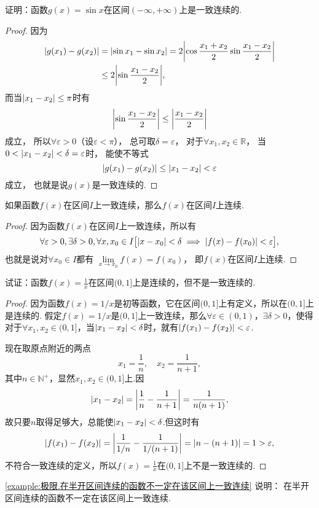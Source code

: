 \begin{example}
证明：函数\(g(x)=\sin x\)在区间\((-\infty,+\infty)\)上是一致连续的.
\begin{proof}
因为
\begin{align*}
\abs{g(x_1)-g(x_2)}
&= \abs{\sin x_1 - \sin x_2}
= 2\abs{\cos\frac{x_1+x_2}{2} \sin\frac{x_1-x_2}{2}} \\
&\leq 2\abs{\sin\frac{x_1-x_2}{2}},
\end{align*}
而当\(\abs{x_1-x_2} \leq \pi\)时有\[
\abs{\sin\frac{x_1-x_2}{2}} \leq \abs{\frac{x_1-x_2}{2}}
\]成立，
所以\(\forall\varepsilon>0\)（设\(\varepsilon<\pi\)），
总可取\(\delta=\varepsilon\)，
对于\(\forall x_1,x_2\in\mathbb{R}\)，
当\(0<\abs{x_1-x_2}<\delta=\varepsilon\)时，
能使不等式\[
\abs{g(x_1)-g(x_2)} \leq \abs{x_1-x_2} < \varepsilon
\]成立，
也就是说\(g(x)\)是一致连续的.
\end{proof}
\end{example}

\begin{theorem}\label{theorem:极限.闭区间上连续函数的性质.一致连续函数一定连续}
如果函数\(f(x)\)在区间\(I\)上一致连续，那么\(f(x)\)在区间\(I\)上连续.
\begin{proof}
因为函数\(f(x)\)在区间\(I\)上一致连续，所以有
\[
\forall \varepsilon > 0,
\exists \delta > 0,
\forall x,x_0 \in I
\bigl[
	 \abs{x-x_0} < \delta
	 \implies
	 \abs{f(x)-f(x_0)} < \varepsilon
\bigr],
\]
也就是说对\(\forall x_0 \in I\)都有%
\(\lim\limits_{x \to x_0} f(x) = f(x_0)\)，
即\(f(x)\)在区间\(I\)上连续.
\end{proof}
\end{theorem}

\begin{example}\label{example:极限.在半开区间连续的函数不一定在该区间上一致连续}
试证：函数\(f(x) = \frac{1}{x}\)在区间\((0,1]\)上是连续的，但不是一致连续的.
\begin{proof}
因为函数\(f(x) = 1/x\)是初等函数，它在区间\((0,1]\)上有定义，所以在\((0,1]\)上是连续的.
假定\(f(x) = 1/x\)是\((0,1]\)上一致连续，那么\(\forall \varepsilon \in (0,1)\)，\(\exists \delta > 0\)，使得对于\(\forall x_1,x_2 \in (0,1]\)，当\(\abs{x_1 - x_2} < \delta\)时，就有\(\abs{f(x_1) - f(x_2)} < \varepsilon\).

现在取原点附近的两点\[
x_1 = \frac{1}{n}, \quad x_2 = \frac{1}{n+1},
\]其中\(n\in\mathbb{N}^+\)，显然\(x_1,x_2 \in (0,1]\)上.因\[
\abs{x_1 - x_2} = \abs{\frac{1}{n} - \frac{1}{n+1}}
= \frac{1}{n(n+1)},
\]故只要\(n\)取得足够大，总能使\(\abs{x_1 - x_2} < \delta\).但这时有\[
\abs{f(x_1) - f(x_2)}
= \abs{\frac{1}{1/n} - \frac{1}{1/(n+1)}}
= \abs{n - (n+1)}
= 1 > \varepsilon,
\]不符合一致连续的定义，所以\(f(x) = \frac{1}{x}\)在\((0,1]\)上不是一致连续的.
\end{proof}
\end{example}
\cref{example:极限.在半开区间连续的函数不一定在该区间上一致连续} 说明：
在半开区间连续的函数不一定在该区间上一致连续.

